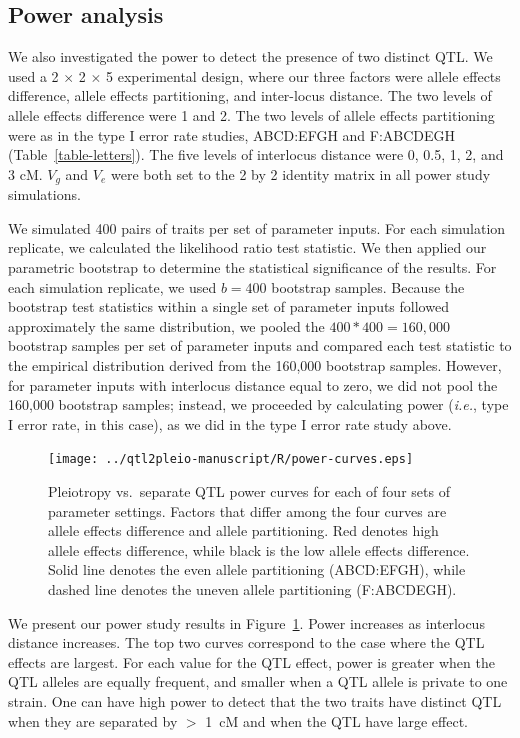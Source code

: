 \documentclass[oneside]{book}\usepackage[]{graphicx}\usepackage[]{color}
\begin{document}
\subsection{Power analysis}

We also investigated the power to detect the presence of two
distinct QTL. We used a 2 $\times$ 2 $\times$ 5 experimental design, where our
three factors were allele effects difference, allele effects
partitioning, and inter-locus distance. The two levels of allele
effects difference were 1 and 2. The two levels of allele effects
partitioning were as in the type I error rate studies, ABCD:EFGH and
F:ABCDEGH (Table~\ref{table-letters}). The five levels of interlocus
distance were 0, 0.5, 1, 2, and 3 cM. $V_g$ and $V_e$ were both set to
the 2 by 2 identity matrix in all power study simulations.

We simulated 400 pairs of traits per set of parameter inputs. For
each simulation replicate, we calculated the likelihood ratio test
statistic. We then applied our parametric bootstrap to determine the
statistical significance of the results. For each simulation replicate, we used $b = 400$ bootstrap
samples. Because the bootstrap test statistics within a single set of
parameter inputs followed approximately the same distribution, we
pooled the $400 * 400 = 160,000$ bootstrap samples per set of
parameter inputs and compared each test statistic to the empirical
distribution derived from the 160,000 bootstrap samples. However, for
parameter inputs with interlocus distance equal to zero, we did not
pool the 160,000 bootstrap samples; instead, we proceeded by
calculating power (\textit{i.e.}, type I error rate, in this case), as we did in the
type I error rate study above.

\begin{figure}
\texttt{[image: ../qtl2pleio-manuscript/R/power-curves.eps]}
\caption{Pleiotropy vs.\ separate QTL power curves for each of four
  sets of parameter settings. Factors that differ among the four
  curves are allele effects difference and allele partitioning. Red denotes high allele effects difference, while black is the low allele effects difference. Solid line denotes the even allele partitioning (ABCD:EFGH), while dashed line denotes the uneven allele partitioning (F:ABCDEGH).}
\label{fig:power}
\end{figure}

We present our power study results in Figure~\ref{fig:power}.
Power increases as interlocus distance increases. The top two curves
correspond to the case where the QTL effects are largest. For each value
for the QTL effect, power is greater when the QTL alleles are equally
frequent, and smaller when a QTL allele is private to one strain. One
can have high power to detect that the two traits have distinct QTL
when they are separated by $>$ 1~cM and when the QTL have large effect.
\end{document}

